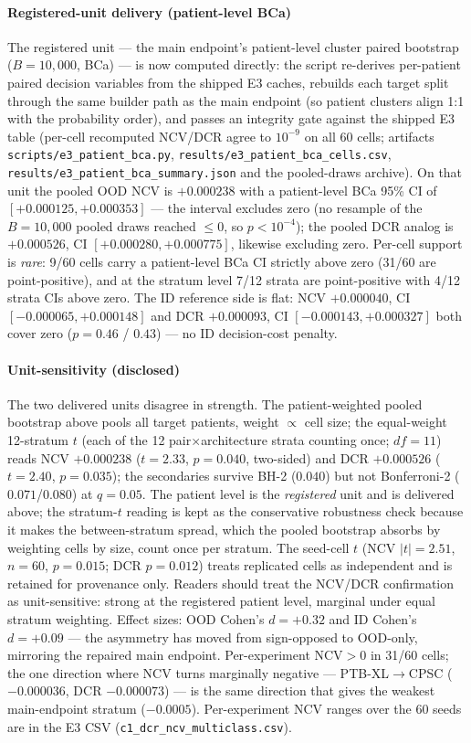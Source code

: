 \documentclass[final,5p,times,nonatbib]{elsarticle}
\begin{document}
\paragraph{Registered-unit delivery (patient-level BCa)} The
registered unit --- the main endpoint's patient-level cluster paired
bootstrap ($B=10{,}000$, BCa) --- is now computed directly: the script
re-derives per-patient paired decision variables from the shipped E3
caches, rebuilds each target split through the same builder path as the
main endpoint (so patient clusters align 1:1 with the probability
order), and passes an integrity gate against the shipped E3 table
(per-cell recomputed NCV/DCR agree to $10^{-9}$ on all 60 cells;
artifacts \texttt{scripts/e3\_patient\_bca.py},
\texttt{results/e3\_patient\_bca\_cells.csv},
\texttt{results/e3\_patient\_bca\_summary.json} and the pooled-draws
archive). On that unit the pooled OOD NCV is $+0.000238$ with a
patient-level BCa 95\% CI of $[+0.000125, +0.000353]$ --- the interval
excludes zero (no resample of the $B=10{,}000$ pooled draws reached
$\le 0$, so $p < 10^{-4}$); the pooled DCR analog is $+0.000526$, CI
$[+0.000280, +0.000775]$, likewise excluding zero. Per-cell support is
\emph{rare}: 9/60 cells carry a patient-level BCa CI strictly above
zero (31/60 are point-positive), and at the stratum level 7/12 strata
are point-positive with 4/12 strata CIs above zero. The ID reference
side is flat: NCV $+0.000040$, CI $[-0.000065, +0.000148]$ and DCR
$+0.000093$, CI $[-0.000143, +0.000327]$ both cover zero ($p = 0.46$ /
$0.43$) --- no ID decision-cost penalty.

\paragraph{Unit-sensitivity (disclosed)} The two delivered units
disagree in strength. The patient-weighted pooled bootstrap above
pools all target patients, weight $\propto$ cell size; the
equal-weight 12-stratum $t$ (each of the 12 pair$\times$architecture
strata counting once; $df=11$) reads NCV $+0.000238$ ($t=2.33$,
$p=0.040$, two-sided) and DCR $+0.000526$ ($t=2.40$, $p=0.035$);
the secondaries survive BH-2 ($0.040$) but not Bonferroni-2
($0.071$/$0.080$) at $q=0.05$. The patient
level is the \emph{registered} unit and is delivered above; the
stratum-$t$ reading is kept as the conservative robustness check
because it makes the between-stratum spread, which the pooled
bootstrap absorbs by weighting cells by size, count once per stratum.
The seed-cell $t$ (NCV $|t|=2.51$, $n=60$, $p=0.015$; DCR $p=0.012$)
treats replicated cells as independent and is retained for provenance
only. Readers should treat the NCV/DCR confirmation as unit-sensitive:
strong at the registered patient level, marginal under equal stratum
weighting. Effect sizes: OOD Cohen's $d = +0.32$ and ID Cohen's
$d = +0.09$ --- the asymmetry has moved from sign-opposed to OOD-only,
mirroring the repaired main endpoint. Per-experiment NCV$>0$ in 31/60
cells; the one direction where NCV turns marginally negative ---
PTB-XL$\rightarrow$CPSC ($-0.000036$, DCR $-0.000073$) --- is the same
direction that gives the weakest main-endpoint stratum ($-0.0005$).
Per-experiment NCV ranges over the 60 seeds are in the E3 CSV
(\texttt{c1\_dcr\_ncv\_multiclass.csv}).
\end{document}
